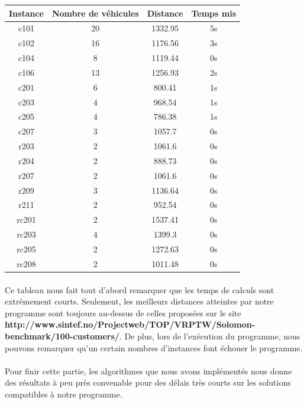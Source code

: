 \documentclass[12pt]{article}
\begin{document}
\begin{tabular}{ |*{4}{c|} }
\hline
   Instance & Nombre de véhicules & Distance & Temps mis \\
 \hline
   c101 & 20 & 1332.95 & 5s \\
 \hline
   c102 & 16 & 1176.56 & 3s \\
 \hline
   c104 & 8 & 1119.44 & 0s \\
 \hline
   c106 & 13 & 1256.93 & 2s \\
 \hline
   c201 & 6 & 800.41 & 1s \\
 \hline
   c203 & 4 & 968.54 & 1s \\
 \hline
   c205 & 4 & 786.38 & 1s \\
 \hline
   c207 & 3 & 1057.7 & 0s \\
 \hline
   r203 & 2 & 1061.6 & 0s \\
 \hline
   r204 & 2 & 888.73 & 0s \\
 \hline
   r207 & 2 & 1061.6 & 0s \\
 \hline
   r209 & 3 & 1136.64 & 0s \\
 \hline
   r211 & 2 & 952.54 & 0s \\
 \hline
   rc201 & 2 & 1537.41 & 0s \\
 \hline
   rc203 & 4 & 1399.3 & 0s \\
 \hline
   rc205 & 2 & 1272.63 & 0s \\
 \hline
   rc208 & 2 & 1011.48 & 0s \\
 \hline
 \end{tabular}

\paragraph{}
Ce tableau nous fait tout d'abord remarquer que les temps de calculs sont extrêmement courts. Seulement, les meilleurs distances atteintes par notre 
programme sont toujours au-dessus de celles proposées sur le site \textbf{http://www.sintef.no/Projectweb/TOP/VRPTW/Solomon-benchmark/100-customers/}.
De plus, lors de l'exécution du programme, nous pouvons remarquer qu'un certain nombres d'instances font échouer le programme. 

\paragraph{}
Pour finir cette partie, les algorithmes que nous avons implémentés nous donne des résultats à peu près convenable pour des délais très courts sur 
les solutions compatibles à notre programme.
\end{document}
